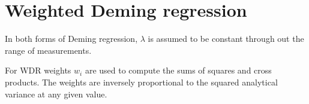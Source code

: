 \documentclass[Chap3amain.tex]{subfiles}
\begin{document}
\section{Weighted Deming regression}
In both forms of Deming regression, $\lambda$ is assumed to be
constant through out the range of measurements.

For WDR weights $w_{i}$ are used to compute the sums of squares
and cross products. The weights are inversely proportional to the
squared analytical variance at any given value.
\end{document}

